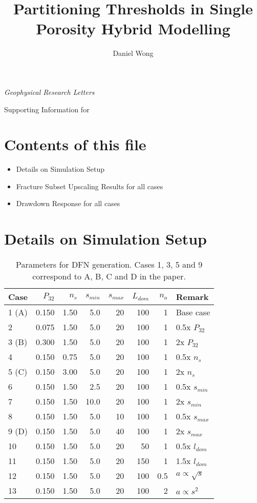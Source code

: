 \documentclass[a4paper]{article}
\title{Partitioning Thresholds in Single Porosity Hybrid Modelling}
\author{Daniel Wong}
\begin{document}
	\begin{center}
		\textit{Geophysical Research Letters}
		
		Supporting Information for
	\end{center}
	{\let\newpage\relax\maketitle}
	
	\section{Contents of this file}
	\begin{itemize}
		\item Details on Simulation Setup
		\item Fracture Subset Upscaling Results for all cases
		\item Drawdown Response for all cases
	\end{itemize}
	
	\section{Details on Simulation Setup}
	\begin{table}[h]
		\centering
		\caption{Parameters for DFN generation. Cases 1, 3, 5 and 9 correspond to A, B, C and D in the paper.}
		
		\begin{tabular}{l r r r r r r l}
			Case & $P_{32}$ & $n_s$ & $s_{min}$ & $s_{max}$ & $L_{dom}$ & $n_a$ & Remark \\
			\hline
			1 (A) & 0.150 & 1.50 & 5.0 & 20 & 100 & 1 & Base case\\
			2 & 0.075 & 1.50 & 5.0 & 20 & 100 & 1 & 0.5x $P_{32}$\\
			3 (B) & 0.300 & 1.50 & 5.0 & 20 & 100 & 1 & 2x $P_{32}$\\
			4 & 0.150 & 0.75 & 5.0 & 20 & 100 & 1 & 0.5x $n_s$\\
			5 (C) & 0.150 & 3.00 & 5.0 & 20 & 100 & 1 & 2x $n_s$\\
			6 & 0.150 & 1.50 & 2.5 & 20 & 100 & 1 & 0.5x $s_{min}$\\
			7 & 0.150 & 1.50 & 10.0 & 20 & 100 & 1 & 2x $s_{min}$\\
			8 & 0.150 & 1.50 & 5.0 & 10 & 100 & 1 & 0.5x $s_{max}$\\
			9 (D) & 0.150 & 1.50 & 5.0 & 40 & 100 & 1 & 2x $s_{max}$\\
			10 & 0.150 & 1.50 & 5.0 & 20 & 50 & 1 & 0.5x $l_{dom}$\\
			11 & 0.150 & 1.50 & 5.0 & 20 & 150 & 1 & 1.5x $l_{dom}$\\
			12 & 0.150 & 1.50 & 5.0 & 20 & 100 & 0.5 & $a \propto \sqrt{s}$\\
			13 & 0.150 & 1.50 & 5.0 & 20 & 100 & 2 & $a \propto s^2$\\
			
		\end{tabular}
		\label{table:DFNparams}
	\end{table}
	
\end{document}
